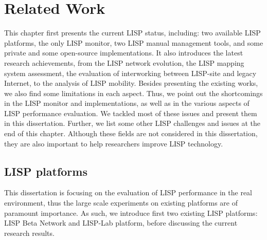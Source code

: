 
\chapter{Related Work}
\label{cha:related_work}

\ifpdf
    \graphicspath{{Chapter3/Pics/Raster/}{Chapter3/Pics/PDF/}{Chapter3/}}
\else
    \graphicspath{{Chapter3/Pics/Vector/}{Chapter3/}}
\fi
This chapter first presents the current LISP status, including: two available LISP platforms, the only LISP monitor, two LISP manual management tools, and some private and some open-source implementations. It also introduces the latest research achievements, from the LISP network evolution, the LISP mapping system assessment, the evaluation of interworking between LISP-site and legacy Internet, to the analysis of LISP mobility. Besides presenting the existing works, we also find some limitations in each aspect. Thus, we point out the shortcomings in the LISP monitor and implementations, as well as in the various aspects of LISP performance evaluation. We tackled most of these issues and present them in this dissertation. %
Further, we list some other LISP challenges and issues at the end of this chapter. Although these fields are not considered in this dissertation, they are also important to help researchers improve LISP technology.


\section{LISP platforms}
\label{sec:platform}
This dissertation is focusing on the evaluation of LISP performance in the real environment, thus the large scale experiments on existing platforms are of paramount importance. As such, we introduce first two existing LISP platforms: LISP Beta Network and LISP-Lab platform, before discussing the current research results.

